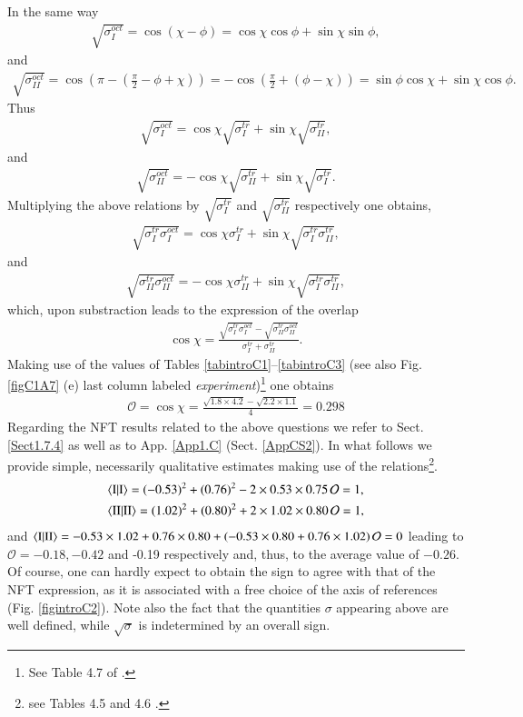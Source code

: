 In the same way
\begin{align}
\sqrt{\sigma^{oct}_I}=\cos(\chi-\phi)=\cos\chi\cos\phi+\sin\chi\sin\phi,
\end{align}
and
\begin{align}
\sqrt{\sigma^{oct}_{II}}=\cos\left(\pi-\left(\frac{\pi}{2}-\phi+\chi\right)\right)=-\cos\left(\frac{\pi}{2}+(\phi-\chi)\right)=\sin\phi\cos\chi+\sin\chi\cos\phi.
\end{align}
Thus
\begin{align}
\sqrt{\sigma^{oct}_{I}}=\cos\chi\sqrt{\sigma^{tr}_{I}}+\sin\chi\sqrt{\sigma^{tr}_{II}},
\end{align}
and
\begin{align}
\sqrt{\sigma^{oct}_{II}}=-\cos\chi\sqrt{\sigma^{tr}_{II}}+\sin\chi\sqrt{\sigma^{tr}_{I}}.
\end{align}
Multiplying the above relations by $\sqrt{\sigma^{tr}_{I}}$ and $\sqrt{\sigma^{tr}_{II}}$ respectively one obtains,
\begin{align}
\sqrt{\sigma^{tr}_{I}\sigma^{oct}_{I}}=\cos\chi\sigma^{tr}_I+\sin\chi\sqrt{\sigma^{tr}_{I}\sigma^{tr}_{II}},
\end{align}
and
\begin{align}
\sqrt{\sigma^{tr}_{II}\sigma^{oct}_{II}}=-\cos\chi\sigma^{tr}_{II}+\sin\chi\sqrt{\sigma^{tr}_{I}\sigma^{tr}_{II}},
\end{align}
which, upon substraction  leads to the  expression of the overlap
\begin{align}
\cos\chi=\frac{\sqrt{\sigma^{tr}_{I}\sigma^{oct}_{I}}-\sqrt{\sigma^{tr}_{II}\sigma^{oct}_{II}}}{\sigma_I^{tr}+\sigma_{II}^{tr}}.
\end{align}
Making use of the values of Tables \ref{tabintroC1}--\ref{tabintroC3} (see also Fig. \ref{figC1A7} (e) last column labeled \textit{experiment})\footnote{See Table 4.7 of \cite{Bortignon:77}.} one obtains
\begin{align}
\mathcal O=\cos\chi=\frac{\sqrt{1.8\times4.2}-\sqrt{2.2\times1.1}}{4}=0.298
\end{align}
  Regarding the NFT results related to  the above questions we refer to Sect. \ref{Sect1.7.4} as well as to App. \ref{App1.C} (Sect. \ref{AppCS2}). In what follows we provide  simple, necessarily qualitative estimates  making use of the relations\footnote{see Tables 4.5 and 4.6  \cite{Bortignon:77}.}.
\begin{align}
\nonumber &\langle {\text{I}|\text{I}} \rangle= (-0.53)^2+(0.76)^2-2\times0.53\times0.75\, \mathcal O=1,\\
\nonumber &\langle {\text{II}|\text{II}} \rangle= (1.02)^2+(0.80)^2+2\times1.02\times0.80\, \mathcal O=1,
\end{align}
and $\langle {\text{I}|\text{II}} \rangle=-0.53\times1.02+0.76\times0.80+(-0.53\times0.80+0.76\times1.02)\,\mathcal O=0$ leading to $\mathcal O=-0.18, -0.42$ and -0.19 respectively and, thus, to the average value of \mbox{$-0.26$}.
 Of course, one can hardly expect to obtain the sign to agree with that of the NFT expression, as it is associated with a free choice of the axis of references (Fig. \ref{figintroC2}). Note also the fact that the quantities $\sigma$ appearing above are well defined, while $\sqrt{\sigma}$ is indetermined by an overall sign.
